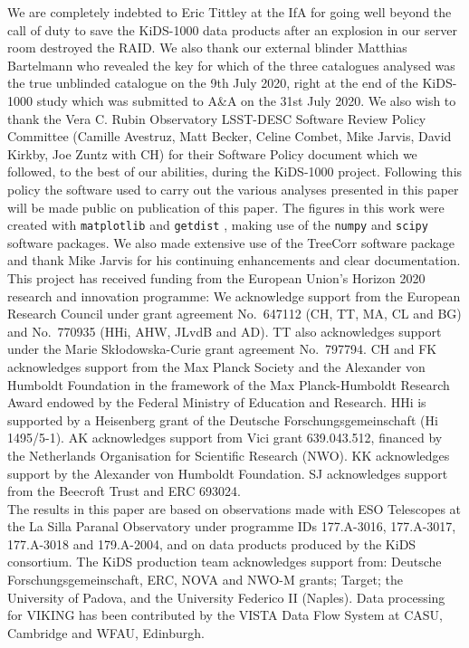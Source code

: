 \documentclass{aa}
\newcommand{\software}[1]{\texttt{#1}}
\begin{document}
\begin{acknowledgements}
We are completely indebted to Eric Tittley at the IfA for going well beyond the call of duty to save the KiDS-1000 data products after an explosion in our server room destroyed the RAID.   We also thank
our external blinder Matthias Bartelmann who revealed the key for which of the three catalogues analysed was the true unblinded catalogue on the 9th July 2020, right at the end of the KiDS-1000 study which was submitted to A\&A on the 31st July 2020.   We also wish to thank the Vera C. Rubin Observatory LSST-DESC Software Review Policy Committee (Camille Avestruz, Matt Becker, Celine Combet, Mike Jarvis, David Kirkby, Joe Zuntz with CH) for their Software Policy document which we followed, to the best of our abilities, during the KiDS-1000 project.   Following this policy the software used to carry out the various analyses presented in this paper will be made public on publication of this paper. 
The figures in this work were created with \software{matplotlib} \citep{Hunter2007} and \software{getdist} \citep{Lewis2019}, making use of the 
\software{numpy} \citep{Oliphant2006} and \software{scipy} \citep{Jones2001} software packages. We also made extensive use of the {\sc TreeCorr} software package and thank
Mike Jarvis for his continuing enhancements and clear documentation.\\

This project has received funding from the European Union's Horizon 2020 research and innovation programme: We acknowledge support from the European Research Council under grant agreement No.~647112 (CH, TT, MA, CL and BG) and No.~770935 (HHi, AHW, JLvdB and AD). TT also acknowledges support under the Marie Sk\l{}odowska-Curie grant agreement No.~797794. CH and FK acknowledges support from the Max Planck Society and the Alexander von Humboldt Foundation in the framework of the Max Planck-Humboldt Research Award endowed by the Federal Ministry of Education and Research. HHi is supported by a Heisenberg grant of the Deutsche Forschungsgemeinschaft (Hi 1495/5-1). AK acknowledges support from Vici grant 639.043.512, financed by the Netherlands Organisation for Scientific Research (NWO). KK acknowledges support by the Alexander von Humboldt Foundation. SJ acknowledges support from the Beecroft Trust and ERC 693024.\\
%
The results in this paper are based on observations made with ESO Telescopes at the La Silla Paranal Observatory under programme IDs 177.A-3016, 177.A-3017, 177.A-3018 and 179.A-2004, and on data products produced by the KiDS consortium. The KiDS production team acknowledges support from: Deutsche Forschungsgemeinschaft, ERC, NOVA and NWO-M grants; Target; the University of Padova, and the University Federico II (Naples).  Data processing for VIKING has been contributed by the VISTA Data Flow System at CASU, Cambridge and WFAU, Edinburgh. 


\end{acknowledgements}
\end{document}
